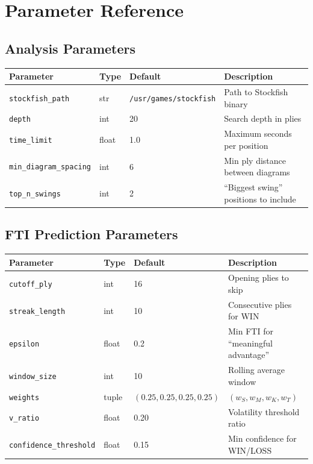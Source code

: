 \documentclass[12pt]{book}
\begin{document}
\section{Parameter Reference}

\subsection{Analysis Parameters}

\begin{center}
\begin{tabular}{llll}
\toprule
\textbf{Parameter} & \textbf{Type} & \textbf{Default} & \textbf{Description} \\
\midrule
\texttt{stockfish\_path} & str & \texttt{/usr/games/stockfish} & Path to Stockfish binary \\
\texttt{depth} & int & 20 & Search depth in plies \\
\texttt{time\_limit} & float & 1.0 & Maximum seconds per position \\
\texttt{min\_diagram\_spacing} & int & 6 & Min ply distance between diagrams \\
\texttt{top\_n\_swings} & int & 2 & ``Biggest swing'' positions to include \\
\bottomrule
\end{tabular}
\end{center}

\subsection{FTI Prediction Parameters}

\begin{center}
\begin{tabular}{llll}
\toprule
\textbf{Parameter} & \textbf{Type} & \textbf{Default} & \textbf{Description} \\
\midrule
\texttt{cutoff\_ply} & int & 16 & Opening plies to skip \\
\texttt{streak\_length} & int & 10 & Consecutive plies for WIN \\
\texttt{epsilon} & float & 0.2 & Min FTI for ``meaningful advantage'' \\
\texttt{window\_size} & int & 10 & Rolling average window \\
\texttt{weights} & tuple & $(0.25, 0.25, 0.25, 0.25)$ & $(w_S, w_M, w_K, w_T)$ \\
\texttt{v\_ratio} & float & 0.20 & Volatility threshold ratio \\
\texttt{confidence\_threshold} & float & 0.15 & Min confidence for WIN/LOSS \\
\bottomrule
\end{tabular}
\end{center}
\end{document}

